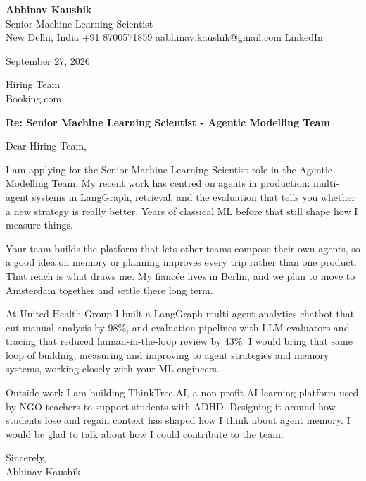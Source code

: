 \documentclass[11pt,a4paper]{article}
\begin{document}
{\Large\bfseries Abhinav Kaushik}\\
Senior Machine Learning Scientist\\
New Delhi, India \textbar{} +91 8700571859 \textbar{} \href{mailto:aabhinav.kaushik@gmail.com}{aabhinav.kaushik@gmail.com} \textbar{} \href{https://www.linkedin.com/in/abhinav-kaushik10/}{LinkedIn}  

September 27, 2026

Hiring Team\\
Booking.com

\textbf{Re: Senior Machine Learning Scientist - Agentic Modelling Team}

Dear Hiring Team,

I am applying for the Senior Machine Learning Scientist role in the Agentic Modelling Team. My recent work has centred on agents in production: multi-agent systems in LangGraph, retrieval, and the evaluation that tells you whether a new strategy is really better. Years of classical ML before that still shape how I measure things.

Your team builds the platform that lets other teams compose their own agents, so a good idea on memory or planning improves every trip rather than one product. That reach is what draws me. My fiancée lives in Berlin, and we plan to move to Amsterdam together and settle there long term.

At United Health Group I built a LangGraph multi-agent analytics chatbot that cut manual analysis by 98\%, and evaluation pipelines with LLM evaluators and tracing that reduced human-in-the-loop review by 43\%. I would bring that same loop of building, measuring and improving to agent strategies and memory systems, working closely with your ML engineers.

Outside work I am building ThinkTree.AI, a non-profit AI learning platform used by NGO teachers to support students with ADHD. Designing it around how students lose and regain context has shaped how I think about agent memory. I would be glad to talk about how I could contribute to the team.

Sincerely,\\[4pt]
Abhinav Kaushik
\end{document}
